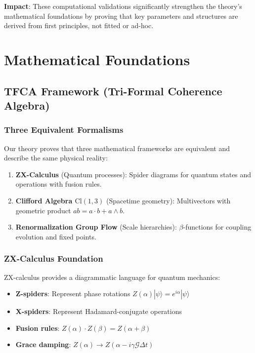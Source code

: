 \documentclass[12pt,a4paper]{article}
\begin{document}
\textbf{Impact}: These computational validations significantly strengthen the theory's mathematical foundations by proving that key parameters and structures are derived from first principles, not fitted or ad-hoc.

\section{Mathematical Foundations}

\subsection{TFCA Framework (Tri-Formal Coherence Algebra)}

\subsubsection{Three Equivalent Formalisms}
Our theory proves that three mathematical frameworks are equivalent and describe the same physical reality:

\begin{enumerate}
\item \textbf{ZX-Calculus} (Quantum processes): Spider diagrams for quantum states and operations with fusion rules.

\item \textbf{Clifford Algebra $\mathrm{Cl}(1,3)$} (Spacetime geometry): Multivectors with geometric product $ab = a \cdot b + a \wedge b$.

\item \textbf{Renormalization Group Flow} (Scale hierarchies): $\beta$-functions for coupling evolution and fixed points.
\end{enumerate}

\subsubsection{ZX-Calculus Foundation}
ZX-calculus provides a diagrammatic language for quantum mechanics:

\begin{itemize}
\item \textbf{Z-spiders}: Represent phase rotations $Z(\alpha) |\psi\rangle = e^{i\alpha} |\psi\rangle$
\item \textbf{X-spiders}: Represent Hadamard-conjugate operations
\item \textbf{Fusion rules}: $Z(\alpha) \cdot Z(\beta) = Z(\alpha + \beta)$
\item \textbf{Grace damping}: $Z(\alpha) \rightarrow Z(\alpha - i\gamma \mathcal{G} \Delta t)$
\end{itemize}
\end{document}
